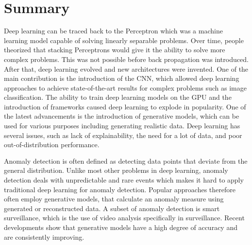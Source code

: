 \section{Summary}
Deep learning can be traced back to the Perceptron which was a machine learning model capable of solving linearly separable problems. Over time, people theorized that stacking Perceptrons would give it the ability to solve more complex problems. This was not possible before back propagation was introduced. After that, deep learning evolved and new architectures were invented. One of the main contribution is the introduction of the CNN, which allowed deep learning approaches to achieve state-of-the-art results for complex problems such as image classification. The ability to train deep learning models on the GPU and the introduction of frameworks caused deep learning to explode in popularity. One of the latest advancements is the introduction of generative models, which can be used for various purposes including generating realistic data. Deep learning has several issues, such as lack of explainability, the need for a lot of data, and poor out-of-distribution performance.
\par
Anomaly detection is often defined as detecting data points that deviate from the general distribution. Unlike most other problems in deep learning, anomaly detection deals with unpredictable and rare events which makes it hard to apply traditional deep learning for anomaly detection. Popular approaches therefore often employ generative models, that calculate an anomaly measure using generated or reconstructed data. A subset of anomaly detection is smart surveillance, which is the use of video analysis specifically in surveillance. Recent developments show that generative models have a high degree of accuracy and are consistently improving.
\par
